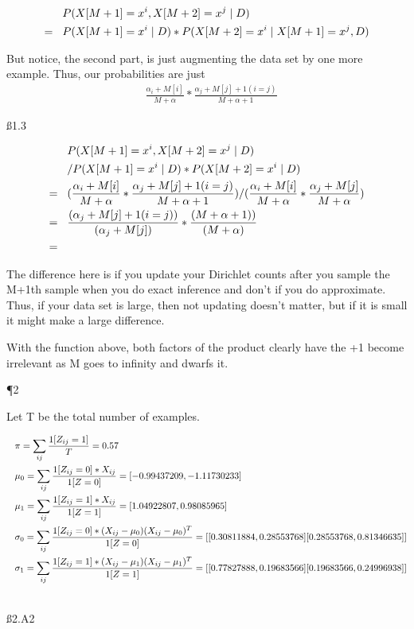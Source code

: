 \begin{align*}
& P(X[M+1] = x^i, X[M+2] = x^j \mid D) \\ = \hspace{3 mm} &
P(X[M+1] = x^i \mid D) * P(X[M+2] = x^i \mid  X[M+1] = x^j, D)
\end{align*}

But notice, the second part, is just augmenting the data set by one more example. Thus, our probabilities are just 
\begin{align*}
& \frac{\alpha_i + M[i]}{M + \alpha} * \frac{\alpha_j + M[j] + 1(i=j)}{M + \alpha + 1}
\end{align*}

\ss{1.3}

\begin{align*}
& P(X[M+1] = x^i, X[M+2] = x^j \mid D) \\ & / P(X[M+1] = x^i \mid D) * P(X[M+2] = x^i \mid  D) \\ = \hspace{3 mm} &
(\frac{\alpha_i + M[i]}{M + \alpha} * \frac{\alpha_j + M[j] + 1(i=j)}{M + \alpha + 1}) / (\frac{\alpha_i + M[i]}{M + \alpha} * \frac{\alpha_j + M[j]}{M + \alpha}) \\ = \hspace{3 mm} &
\frac{(\alpha_j + M[j] + 1(i=j))}{ (\alpha_j + M[j])} * \frac{(M + \alpha + 1))}{(M+\alpha)} \\ = \hspace{3 mm} &
\end{align*}

The difference here is if you update your Dirichlet counts after you sample the M+1th sample when you do exact inference and don't if you do approximate. Thus, if your data set is large, then not updating doesn't matter, but if it is small it might make a large difference.

With the function above, both factors of the product clearly have the +1 become irrelevant as M goes to infinity and dwarfs it.

\P 2

Let T be the total number of examples.

\begin{align*}
& \pi = \sum_{ij}\frac{1[Z_{ij}=1]}{T} = 0.57 \\ \hspace{3 mm} &
\mu_0 = \sum_{ij}\frac{1[Z_{ij}=0] * X_{ij}}{1[Z=0]} = [-0.99437209, -1.11730233] \\ \hspace{3 mm} &
\mu_1 = \sum_{ij}\frac{1[Z_{ij}=1] * X_{ij}}{1[Z=1]} = [ 1.04922807,  0.98085965] \\ \hspace{3 mm} &
\sigma_0 = \sum_{ij}\frac{1[Z_{ij}=0] * (X_{ij} - \mu_0) (X_{ij} - \mu_0) ^ T}{1[Z=0]} = [[ 0.30811884,  0.28553768]
 [ 0.28553768 , 0.81346635]] \\ \hspace{3 mm} &
\sigma_1 = \sum_{ij}\frac{1[Z_{ij}=1] * (X_{ij} - \mu_1) (X_{ij} - \mu_1) ^ T}{1[Z=1]} = [[ 0.77827888 , 0.19683566]
 [ 0.19683566,  0.24996938]] \\ \hspace{3 mm} &
\end{align*}

\ss{2.A2}


